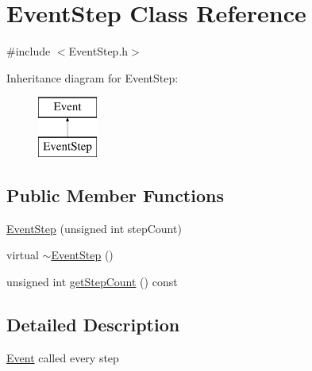 \hypertarget{class_event_step}{\section{Event\+Step Class Reference}
\label{class_event_step}
}


{\ttfamily \#include $<$Event\+Step.\+h$>$}

Inheritance diagram for Event\+Step\+:\begin{figure}[H]
\begin{center}
\leavevmode
\includegraphics[height=2.000000cm]{class_event_step}
\end{center}
\end{figure}
\subsection*{Public Member Functions}
\begin{DoxyCompactItemize}
\item 
\hyperlink{class_event_step_a00df7973f32444b8e0d677ce2a3e34b1}{Event\+Step} (unsigned int step\+Count)
\item 
virtual \hyperlink{class_event_step_a1fd5402baa54bf82bac6bc8b6f3a84d1}{$\sim$\+Event\+Step} ()
\item 
unsigned int \hyperlink{class_event_step_a39878b3b58788d25012b417f5863c254}{get\+Step\+Count} () const 
\end{DoxyCompactItemize}


\subsection{Detailed Description}
\hyperlink{class_event}{Event} called every step 

